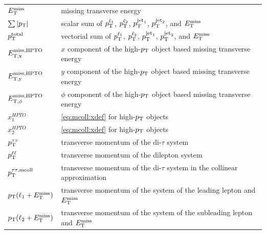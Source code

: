\begin{table}[htpb]
\begin{tabular}{ll}
    $E_\text{T}^\text{miss}$               & missing transverse energy \\
    $\sum \left|p_\text{T}\right|$        & scalar sum of $p_\text{T}^{\ell_1}$, $p_\text{T}^{\ell_2}$, $p_\text{T}^{\text{jet}_1}$, $p_\text{T}^{\text{jet}_2}$, and $E_\text{T}^\text{miss}$ \\
    $p_\text{T}^\text{total}$      & vectorial sum of $p_\text{T}^{\ell_1}$, $p_\text{T}^{\ell_2}$, $p_\text{T}^{\text{jet}_1}$, $p_\text{T}^{\text{jet}_2}$, and $E_\text{T}^\text{miss}$\\
    $E_\text{T,x}^\text{miss,HPTO}$          & $x$ component of the high-$p_\text{T}$ object based missing transverse energy \\
    $E_\text{T,y}^\text{miss,HPTO}$          & $y$ component of the high-$p_\text{T}$ object based missing transverse energy \\
    $E_{\text{T},\phi}^\text{miss,HPTO}$        & $\phi$ component of the high-$p_\text{T}$ object based missing transverse energy \\
    $x_1^{HPTO}$            & \cref{eq:mcoll:xdef} for high-$p_\text{T}$ objects \\
    $x_2^{HPTO}$            & \cref{eq:mcoll:xdef} for high-$p_\text{T}$ objects \\
    $p_\text{T}^{\tau\tau}$        & transverse momentum of the di-$\tau$ system \\
    $p_\text{T}^{\ell\ell}$        & transverse momentum of the dilepton system \\
    $p_\text{T}^{\tau\tau,\text{mcoll}}$ & transverse momentum of the di-$\tau$ system in the collinear approximation \\
    $p_\text{T} (\ell_1 + E_\text{T}^\text{miss})$ & transverse momentum of the system of the leading lepton and $E_\text{T}^\text{miss}$ \\
    $p_\text{T} (\ell_2 + E_\text{T}^\text{miss})$ & transverse momentum of the system of the subleading lepton and $E_\text{T}^\text{miss}$ \\
        \bottomrule
    \end{tabular}
\end{table}

